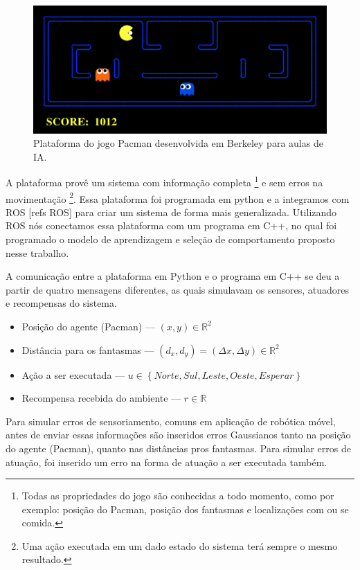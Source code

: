 \begin{figure}[H]
    \centering
    \includegraphics[width=120mm]{images/pacman_platform}
    \caption{\label{img:ModeloProbabilisticoCarla}Plataforma do jogo Pacman desenvolvida em Berkeley para aulas de IA.}
\end{figure}

A plataforma provê um sistema com informação completa%
\footnote{Todas as propriedades do jogo são conhecidas a todo momento, como por exemplo: posição do Pacman, posição dos fantasmas e localizações com ou se comida.%
} e sem erros na movimentação%
\footnote{Uma ação executada em um dado estado do sistema terá sempre o mesmo resultado.%
}. Essa plataforma foi programada em python e a integramos com ROS [refs ROS] para criar um sistema de forma mais generalizada. Utilizando ROS nós conectamos essa plataforma com um programa em C++, no qual foi programado o modelo de aprendizagem e seleção de comportamento proposto nesse trabalho.

A comunicação entre a plataforma em Python e o programa em C++ se deu a partir de quatro mensagens diferentes, as quais simulavam os sensores, atuadores e recompensas do sistema.

\begin{itemize}
	\item Posição do agente (Pacman) --- $ \left( x, y \right) \in \mathbb{R}^2 $
	\item Distância para os fantasmas --- $ \left( d_x, d_y \right) = \left( \Delta x, \Delta y \right) \in \mathbb{R}^2 $
	\item Ação a ser executada --- $ u \in \left\{Norte, Sul, Leste, Oeste, Esperar \right\} $
	\item Recompensa recebida do ambiente --- $ r \in \mathbb{R} $
\end{itemize}

Para simular erros de sensoriamento, comuns em aplicação de robótica móvel, antes de enviar essas informações são inseridos erros Gaussianos tanto na posição do agente (Pacman), quanto nas distâncias pros fantasmas. Para simular erros de atuação, foi inserido um erro na forma de atuação a ser executada também.

